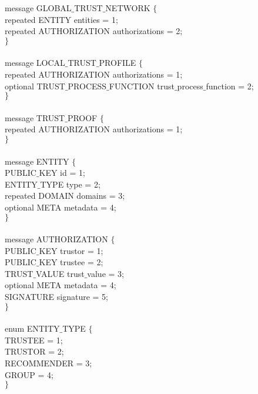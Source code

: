 \documentclass{article}
\begin{document}
message GLOBAL$\_$TRUST$\_$NETWORK $\{$\\
\hspace*{2.ex} repeated ENTITY entities = 1;\\
\hspace*{2.ex} repeated AUTHORIZATION authorizations = 2;\\
$\}$\\
\\
message LOCAL$\_$TRUST$\_$PROFILE $\{$\\
\hspace*{2.ex} repeated AUTHORIZATION authorizations = 1;\\
\hspace*{2.ex} optional TRUST$\_$PROCESS$\_$FUNCTION trust$\_$process$\_$function = 2;\\
$\}$\\
\\
message TRUST$\_$PROOF $\{$\\
\hspace*{2.ex} repeated AUTHORIZATION authorizations = 1;\\
$\}$\\
\\
message ENTITY $\{$\\
\hspace*{2.ex} PUBLIC$\_$KEY id = 1;\\
\hspace*{2.ex} ENTITY$\_$TYPE type = 2;\\
\hspace*{2.ex} repeated DOMAIN domains = 3;\\
\hspace*{2.ex} optional META metadata = 4;\\
$\}$\\
\\
message AUTHORIZATION $\{$\\
\hspace*{2.ex} PUBLIC$\_$KEY trustor = 1;\\
\hspace*{2.ex} PUBLIC$\_$KEY trustee = 2;\\
\hspace*{2.ex} TRUST$\_$VALUE trust$\_$value = 3;\\
\hspace*{2.ex} optional META metadata = 4;\\
\hspace*{2.ex} SIGNATURE signature = 5;\\
$\}$\\
\\
enum ENTITY$\_$TYPE $\{$\\
\hspace*{2.ex} TRUSTEE = 1;\\
\hspace*{2.ex} TRUSTOR = 2;\\
\hspace*{2.ex} RECOMMENDER = 3;\\
\hspace*{2.ex} GROUP = 4;\\
$\}$
\end{document}
